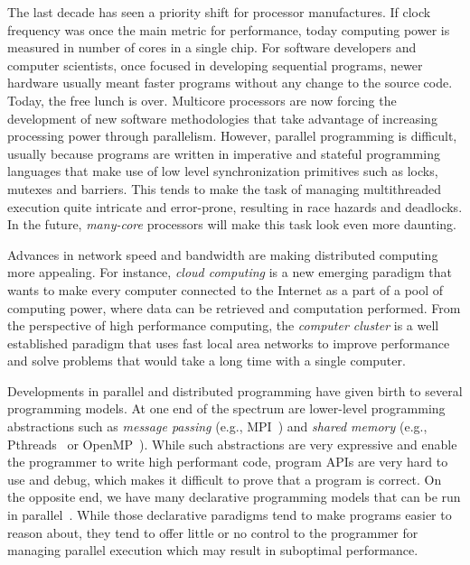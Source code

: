 
The last decade has seen a priority shift for processor manufactures. If clock
frequency was once the main metric for performance, today computing power is
measured in number of cores in a single chip.  For software developers and
computer scientists, once focused in developing sequential programs, newer
hardware usually meant faster programs without any change to the source code.
Today, the free lunch is over. Multicore processors are now forcing the
development of new software methodologies that take advantage of increasing
processing power through parallelism.  However, parallel programming is
difficult, usually because programs are written in imperative and stateful
programming languages that make use of low level synchronization primitives such
as locks, mutexes and barriers. This tends to make the task of managing
multithreaded execution quite intricate and error-prone, resulting in race
hazards and deadlocks.  In the future, \emph{many-core} processors will make
this task look even more daunting.

Advances in network speed and bandwidth are making distributed computing more
appealing. For instance, \emph{cloud computing} is a new emerging paradigm that
wants to make every computer connected to the Internet as a part of a pool of
computing power, where data can be retrieved and computation performed. From the
perspective of high performance computing, the \emph{computer cluster} is a well
established paradigm that uses fast local area networks to improve performance
and solve problems that would take a long time with a single computer.

Developments in parallel and distributed programming have given birth to several
programming models.  At one end of the spectrum are lower-level programming
abstractions such as \emph{message passing} (e.g.,
MPI~\cite{gabriel04-open-mpi}) and \emph{shared memory} (e.g.,
Pthreads~\cite{Butenhof:1997:PPT:263953} or
OpenMP~\cite{Chapman-2007-UOP-1370966}).  While such abstractions are
very expressive and enable the programmer to write high performant code,
program APIs are very hard to use and debug, which makes it difficult to
prove that a program is correct.  On the opposite end, we have many
declarative programming models that can be run in
parallel~\cite{Blelloch:1996:PPA:227234.227246}.  While those declarative
paradigms tend to make programs easier to reason about, they tend to offer
little or no control to the programmer for managing parallel execution
which may result in suboptimal performance.

